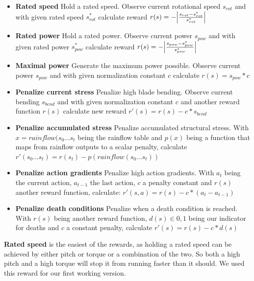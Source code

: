 \documentclass[hyperref,beleg]{cgvpub}
\begin{document}
\begin{itemize}

\item \textbf{Rated speed} Hold a rated speed. Observe current rotational speed \(s_{rot}\) and with given rated speed \(s^*_{rot}\) calculate reward \(r(s) = -\abs{\frac{s_{rot} - s^*_{rot}}{s^*_{rot}}}\)

\item \textbf{Rated power} Hold a rated power. Observe current power \(s_{pow}\) and with given rated power \(s^*_{pow}\) calculate reward \(r(s) = -\abs{\frac{s_{pow} - s^*_{pow}}{s^*_{pow}}}\)

\item \textbf{Maximal power} Generate the maximum power possible. Observe current power \(s_{pow}\) and with given normalization constant \(c\) calculate \(r(s) = s_{pow} * c\)

\item \textbf{Penalize current stress} Penalize high blade bending. Observe current bending \(s_{bend}\) and with given normalization constant \(c\) and another reward function \(r(s)\) calculate new reward \(r'(s) = r(s) - c * s_{bend} \)

\item \textbf{Penalize accumulated stress} Penalize accumulated structural stress. With \(x = rainflow(s_0...s_t\) being the rainflow table and \(p(x)\) being a function that maps from rainflow outputs to a scalar penalty, calculate \(r'(s_0...s_t) = r(s_t) - p(rainflow(s_0...s_t))\)

\item \textbf{Penalize action gradients} Penalize high action gradients. With \(a_t\) being the current action, \(a_{t-1}\) the last action, \(c\) a penalty constant and \(r(s)\) another reward function, calculate: \(r'(s, a) = r(s) - c * (a_t - a_{t-1})\)

\item \textbf{Penalize death conditions} Penalize when a death condition is reached. With $r(s)$ being another reward function, $d(s) \in {0,1}$ being our indicator for deaths and $c$ a constant penalty, calculate $r'(s) = r(s) - c * d(s)$

\end{itemize}

\textbf{Rated speed} is the easiest of the rewards, as holding a rated speed can be achieved by either pitch or torque or a combination of the two. So both a high pitch and a high torque will stop it from running faster than it should. We used this reward for our first working version.
\end{document}
